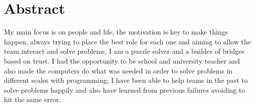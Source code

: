 \section{Abstract}

My main focus is on people and life, the motivation is key to make things
happen, always trying to place the best role for each one and aiming to
allow the team interact and solve problems, I am a puzzle solver and a 
builder of bridges based on trust. I had the opportunity to be school and
university teacher and also made the computers do what was needed in order 
to solve problems in different scales with programming; I have been able 
to help teams in the past to solve problems happily and also have learned
from previous failures avoiding to hit the same error.
